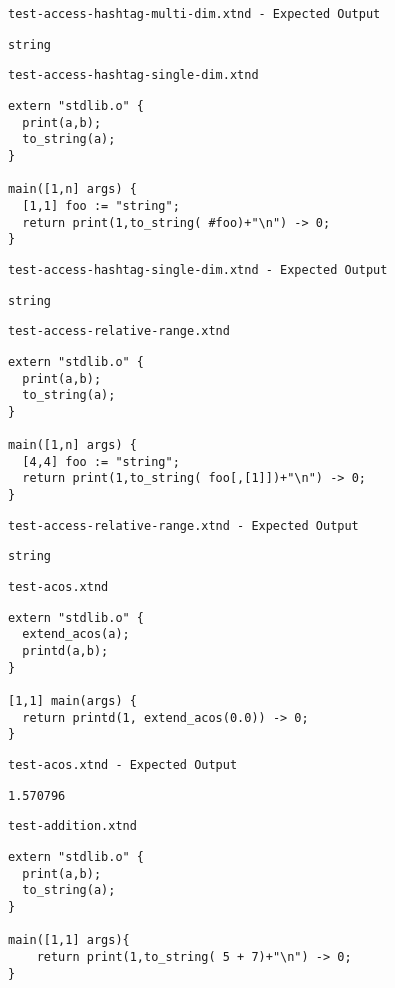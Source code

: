 \medskip \noindent \texttt{test-access-hashtag-multi-dim.xtnd - Expected Output}


\begin{lstlisting}
string
\end{lstlisting}


\medskip \noindent \texttt{test-access-hashtag-single-dim.xtnd}


\begin{lstlisting}
extern "stdlib.o" {
  print(a,b);
  to_string(a);
}

main([1,n] args) {
  [1,1] foo := "string";
  return print(1,to_string( #foo)+"\n") -> 0;
}
\end{lstlisting}


\medskip \noindent \texttt{test-access-hashtag-single-dim.xtnd - Expected Output}


\begin{lstlisting}
string
\end{lstlisting}


\medskip \noindent \texttt{test-access-relative-range.xtnd}


\begin{lstlisting}
extern "stdlib.o" {
  print(a,b);
  to_string(a);
}

main([1,n] args) {
  [4,4] foo := "string";
  return print(1,to_string( foo[,[1]])+"\n") -> 0;
}
\end{lstlisting}


\medskip \noindent \texttt{test-access-relative-range.xtnd - Expected Output}


\begin{lstlisting}
string
\end{lstlisting}


\medskip \noindent \texttt{test-acos.xtnd}


\begin{lstlisting}
extern "stdlib.o" {
  extend_acos(a);
  printd(a,b);
}

[1,1] main(args) {
  return printd(1, extend_acos(0.0)) -> 0;
}
\end{lstlisting}


\medskip \noindent \texttt{test-acos.xtnd - Expected Output}


\begin{lstlisting}
1.570796
\end{lstlisting}


\medskip \noindent \texttt{test-addition.xtnd}


\begin{lstlisting}
extern "stdlib.o" {
  print(a,b);
  to_string(a);
}

main([1,1] args){
	return print(1,to_string( 5 + 7)+"\n") -> 0;
}
\end{lstlisting}


